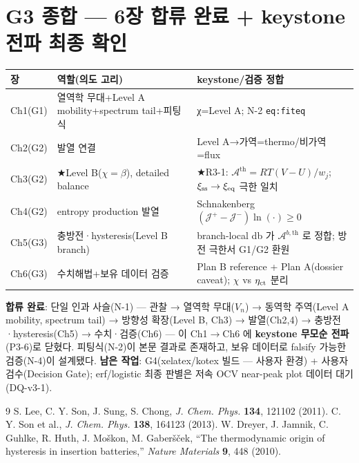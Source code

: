 \documentclass[11pt,a4paper]{article}
\begin{document}
\section*{G3 종합 — 6장 합류 완료 + keystone 전파 최종 확인}
\begin{longtable}{p{} p{} p{}}
\toprule 장 & 역할(의도 고리) & keystone/검증 정합 \\ \midrule \endhead
Ch1(G1) & 열역학 무대+Level A mobility+spectrum tail+피팅식 & χ=Level A; N-2 \texttt{eq:fiteq} \\
Ch2(G2) & 발열 연결 & Level A→가역=thermo/비가역=flux \\
Ch3(G2) & ★Level B($\chi=\beta$), detailed balance & ★R3-1: $\mathcal A^\mathrm{th}=RT(V-U)/w_j$; $\xi_{\mathrm{ss}}\to\xi_{\mathrm{eq}}$ 극한 일치 \\
Ch4(G2) & entropy production 발열 & Schnakenberg $(\mathcal J^+-\mathcal J^-)\ln(\cdot)\ge0$ \\
Ch5(G3) & 충방전·hysteresis(Level B branch) & branch-local db 가 $\mathcal A^{b,\mathrm{th}}$ 로 정합; 방전 극한서 G1/G2 환원 \\
Ch6(G3) & 수치해법+보유 데이터 검증 & Plan B reference + Plan A(dossier caveat); $\chi$ vs $\eta_{\mathrm{ct}}$ 분리 \\
\bottomrule
\end{longtable}
\textbf{합류 완료}: 단일 인과 사슬(N-1) — 관찰 → 열역학 무대($V_n$) → 동역학 주역(Level A mobility,
spectrum tail) → 방향성 확장(Level B, Ch3) → 발열(Ch2,4) → 충방전·hysteresis(Ch5) → 수치·검증(Ch6) —
이 Ch1$\to$Ch6 에 \textbf{keystone 무모순 전파}(P3-6)로 닫혔다. 피팅식(N-2)이 본문 결과로 존재하고,
보유 데이터로 falsify 가능한 검증(N-4)이 설계됐다. \textbf{남은 작업}: G4(xelatex/kotex 빌드 — 사용자
환경) + 사용자 검수(Decision Gate); erf/logistic 최종 판별은 저속 OCV near-peak plot 데이터 대기(DQ-v3-1).

\begin{thebibliography}{9}
 S. Lee, C. Y. Son, J. Sung, S. Chong, \emph{J. Chem. Phys.} \textbf{134}, 121102 (2011).
 C. Y. Son et al., \emph{J. Chem. Phys.} \textbf{138}, 164123 (2013).
 W. Dreyer, J. Jamnik, C. Guhlke, R. Huth, J. Mo\v{s}kon, M. Gaber\v{s}\v{c}ek, ``The thermodynamic origin of hysteresis in insertion batteries,'' \emph{Nature Materials} \textbf{9}, 448 (2010).
\end{thebibliography}
\end{document}
